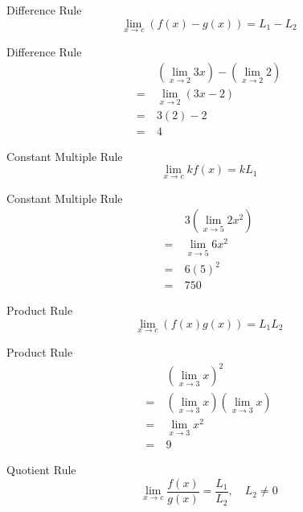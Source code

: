 \begin{definition}{Difference Rule}
    \[ \lim_{x \to c} \left( f \left( x \right) - g \left( x \right) \right) = L_1 - L_2 \]
\end{definition}

\begin{example}{Difference Rule}
    \begin{align}
        &\left( \lim_{x \to 2} 3x \right) - \left( \lim_{x \to 2} 2 \right) \\
        = \> &\lim_{x \to 2} \left(3x - 2 \right) \\
        = \> &3\left( 2 \right) - 2 \\
        = \> &4
    \end{align}
\end{example}

\begin{definition}{Constant Multiple Rule}
    \[ \lim_{x \to c} k f \left( x \right) = k L_1 \]
\end{definition}

\begin{example}{Constant Multiple Rule}
    \begin{align}
        &3 \left( \lim_{x \to 5} 2x^2 \right) \\
        = \> &\lim_{x \to 5} 6x^2 \\
        = \> &6 \left( 5 \right)^2 \\
        = \> &750
    \end{align}
\end{example}

\begin{definition}{Product Rule}
    \[ \lim_{x \to c} \left( f \left( x \right) g \left( x \right) \right) = L_1 L_2 \]
\end{definition}

\begin{example}{Product Rule}
    \begin{align}
        &\left( \lim_{x \to 3} x \right)^2 \\
        = \> &\left( \lim_{x \to 3} x \right) \left( \lim_{x \to 3} x \right) \\
        = \> &\lim_{x \to 3} x^2 \\
        = \> &9
    \end{align}
\end{example}

\begin{definition}{Quotient Rule}
    \[ \lim_{x \to c} \dfrac{f \left( x \right)}{g \left( x \right)} = \dfrac{L_1}{L_2}, \quad L_2 \ne 0 \]
\end{definition}

